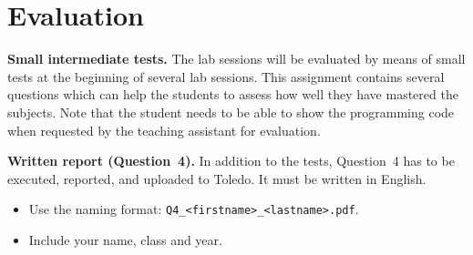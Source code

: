 \documentclass[11pt,a4paper]{article}
\begin{document}





\FloatBarrier
\section{Evaluation}

\textbf{Small intermediate tests.}
The lab sessions will be evaluated by means of small tests at the beginning of several lab sessions. 
This assignment contains several questions which can help the students to assess how well they have mastered the subjects. 
Note that the student needs to be able to show the programming code when requested by the teaching assistant for evaluation.

\textbf{Written report (Question~4).}
In addition to the tests, Question~4 has to be executed, reported, and uploaded to Toledo.
It must be written in English. 
\begin{itemize}
    \item Use the naming format:  \verb|Q4_<firstname>_<lastname>.pdf|.
    \item Include your name, class and year.
\end{itemize} 
\end{document}
